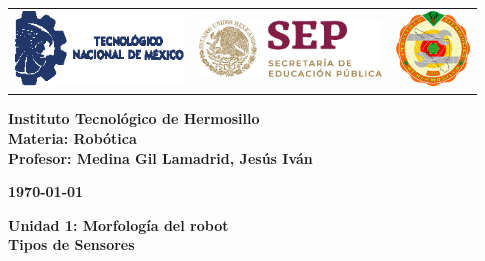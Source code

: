 \begin{titlepage}
	\centering
	\begin{tabular}{@{}p{} p{} p{}@{}}
		\includegraphics[height=2cm]{tecnm} & 
		\centering \includegraphics[height=1.5cm]{SEP} & 
		\raggedleft \includegraphics[height=2cm]{ith.jpg} \\
	\end{tabular}
	
	\vspace{2em}
	
	\noindent
	\begin{minipage}[t]{0.48\textwidth}
		\raggedright
		\small \textbf{%
			Instituto Tecnológico de Hermosillo\\
			Materia: Robótica\\
			Profesor: Medina Gil Lamadrid, Jesús Iván%
		}
	\end{minipage}%
	\hfill
	\begin{minipage}[t]{0.48\textwidth}
		\raggedleft
		\small \textbf{\today}
	\end{minipage}
	
	\vspace{2em}
	
	{\large \textbf{Unidad 1: Morfología del robot}}\\
	{\Huge \textbf{Tipos de Sensores}}
		
	\vspace{1em}
	

\end{titlepage}
